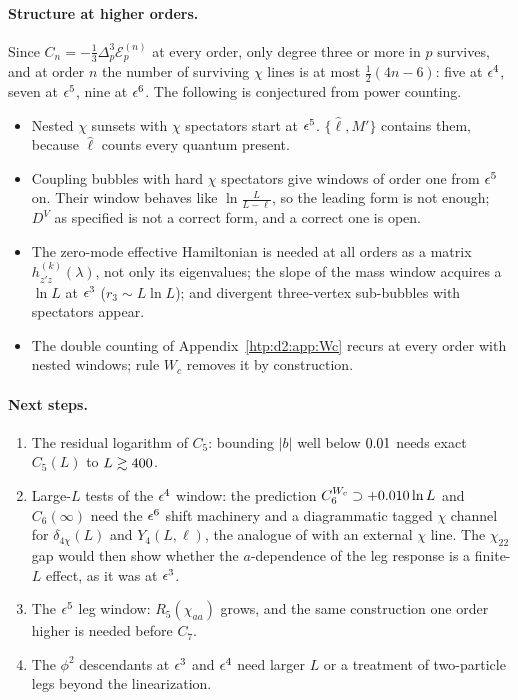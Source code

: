 \paragraph{Structure at higher orders.} Since $C_n=-\frac13\Delta_p^3\mathcal E_p^{(n)}$ at every order, only degree three or
more in $p$ survives, and at order $n$ the number of surviving $\chi$ lines is at most $\frac12(4n-6)$: five at $\epsilon^4$, seven at
$\epsilon^5$, nine at $\epsilon^6$. The following is conjectured from power counting.
\begin{itemize}
\item Nested $\chi$ sunsets with $\chi$ spectators start at $\epsilon^5$. $\{\hat\ell,M'\}$ contains them, because $\hat\ell$ counts
 every quantum present.
\item Coupling bubbles with hard $\chi$ spectators give windows of order one from $\epsilon^5$ on. Their window behaves like
 $\ln\frac L{L-\ell}$, so the leading form is not enough; $D^V$ as specified is not a correct form, and a correct one is open.
\item The zero-mode effective Hamiltonian is needed at all orders as a matrix $h^{(k)}_{z'z}(\lambda)$, not only its
 eigenvalues; the slope of the mass window acquires a $\ln L$ at $\epsilon^3$ ($r_3\sim L\ln L$); and divergent three-vertex
 sub-bubbles with spectators appear.
\item The double counting of Appendix~\ref{htp:d2:app:Wc} recurs at every order with nested windows; rule $W_c$ removes it by
 construction.
\end{itemize}

\paragraph{Next steps.}
\begin{enumerate}
\item The residual logarithm of $C_5$: bounding $|b|$ well below $0.01$ needs exact $C_5(L)$ to $L\gtrsim400$.
\item Large-$L$ tests of the $\epsilon^4$ window: the prediction $C_6^{W_c}\supset+0.010\ln L$ and $C_6(\infty)$ need the
 $\epsilon^6$ shift machinery and a diagrammatic tagged $\chi$ channel for $\delta_{4\chi}(L)$ and $Y_4(L,\ell)$, the analogue of
  with an external $\chi$ line. The $\chi_{22}$ gap would then show whether the
 $a$-dependence of the leg response is a finite-$L$ effect, as it was at $\epsilon^3$.
\item The $\epsilon^5$ leg window: $R_5(\chi_{aa})$ grows, and the same construction one order higher is needed before $C_7$.
\item The $\phi^2$ descendants at $\epsilon^3$ and $\epsilon^4$ need larger $L$ or a treatment of two-particle legs beyond the
 linearization.
\end{enumerate}

